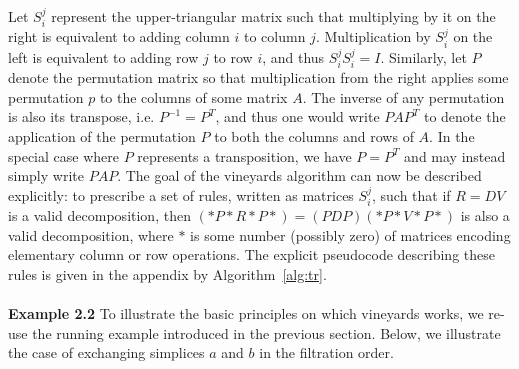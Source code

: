 \documentclass{siamart190516}
\newcommand\topstrut[1][1.1ex]{\setlength\bigstrutjot{#1}{\bigstrut[t]}}
\newcommand\botstrut[1][0.95ex]{\setlength\bigstrutjot{#1}{\bigstrut[b]}}
\begin{document}
Let $S_{i}^j$ represent the upper-triangular matrix such that multiplying by it on the right is equivalent to adding column $i$ to column $j$. 
Multiplication by $S_{i}^j$ on the left is equivalent to adding row $j$ to row $i$, and thus $S_{i}^j S_{i}^j = I$. 
Similarly, let $P$ denote the permutation matrix so that multiplication from the right applies some permutation $p$ to the columns of some matrix $A$. 
The inverse of any permutation is also its transpose, i.e. $P^{-1} = P^T$, and thus one would write $P A P^T$ to denote the application of the permutation $P$ to both the columns and rows of $A$. In the special case where $P$ represents a transposition, we have $P = P^T$ and may instead simply write $P A P$. 
The goal of the vineyards algorithm can now be described explicitly: to prescribe a set of rules, written as matrices $S_{i}^{j}$, such that if $R = D V$ is a valid decomposition, then $(\ast P \ast R \ast P \ast) = (PDP)(\ast P\ast V \ast P \ast)$ is also a valid decomposition, where $\ast$ is some number (possibly zero) of matrices encoding elementary column or row operations. 
The explicit pseudocode describing these rules is given in the appendix by Algorithm~\ref{alg:tr}. 
\\
\\
\noindent 
\textbf{Example 2.2} To illustrate the basic principles on which vineyards works, we re-use the running example introduced in the previous section. Below, we illustrate the case of exchanging simplices $a$ and $b$ in the filtration order. 
\end{document}
